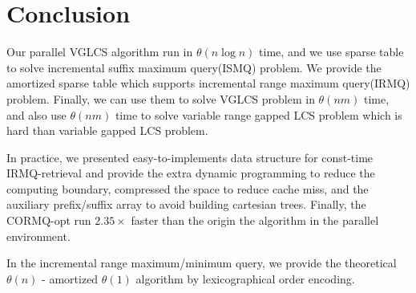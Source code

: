 \section{Conclusion}
\label{sec:Conclusion}

Our parallel VGLCS algorithm run in $\theta(n \log n)$ time, and we
use sparse table to solve incremental suffix maximum query(ISMQ)
problem.  We provide the amortized sparse table which supports
incremental range maximum query(IRMQ) problem.  Finally, we can use
them to solve VGLCS problem in $\theta(nm)$ time, and also use
$\theta(nm)$ time to solve variable range gapped LCS problem which is
hard than variable gapped LCS problem.

In practice, we presented easy-to-implements data structure for
const-time IRMQ-retrieval and provide the extra dynamic programming to
reduce the computing boundary, compressed the space to reduce cache
miss, and the auxiliary prefix/suffix array to avoid building
cartesian trees. Finally, the CORMQ-opt run $2.35 \times$ faster than
the origin the algorithm in the parallel environment.

In the incremental range maximum/minimum query, we provide the
theoretical $\theta(n)$ - amortized $\theta(1)$ algorithm by
lexicographical order encoding.